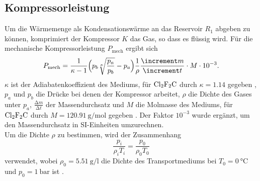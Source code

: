 \subsection{Kompressorleistung}
Um die Wärmemenge als Kondensationswärme an das Reservoir $R_1$ abgeben zu können, komprimiert der Kompressor $K$ das Gas, so dass es flüssig wird.
Für die mechanische Kompressorleistung $P_{\text{mech}}$ ergibt sich
\begin{equation}
  P_{\text{mech}} = \frac{1}{\kappa -1}\Bigl(p_b \sqrt[\kappa]{\frac{p_a}{p_b}} - p_a \Bigr) \frac{1}{\rho} \frac{\increment m}{\increment t} \cdot M \cdot 10^{-3}.
\end{equation}
$\kappa$ ist der Adiabatenkoeffizient des Mediums, für $\ce{Cl2F2C}$ durch $\kappa = 1.14$ gegeben \cite{sample}, $p_a$ und $p_b$ die Drücke bei denen der Kompressor arbeitet, $\rho$ die Dichte des Gases unter $p_a$, $\frac{\increment m}{\increment t}$ der Massendurchsatz und $M$ die Molmasse des Mediums, für $\ce{Cl2F2C}$ durch $M = \SI{120.91}{\gram\per\mol}$ gegeben \cite{pubchem}. Der Faktor $10^{-3}$ wurde ergänzt, um den Massendurchsatz in SI-Einheiten umzurechnen. \\
Um die Dichte $\rho$ zu bestimmen, wird der Zusammenhang
\begin{equation}
  \frac{p_i}{\rho_iT_i} = \frac{p_0}{\rho_0T_0}
\end{equation}
verwendet, wobei $\rho_0 = \SI{5,51}{\gram\per\litre}$ die Dichte des Transportmediums bei $T_0 = \SI{0}{\celsius}$ und $p_0 = \SI{1}{\bar}$ ist \cite{sample}.
